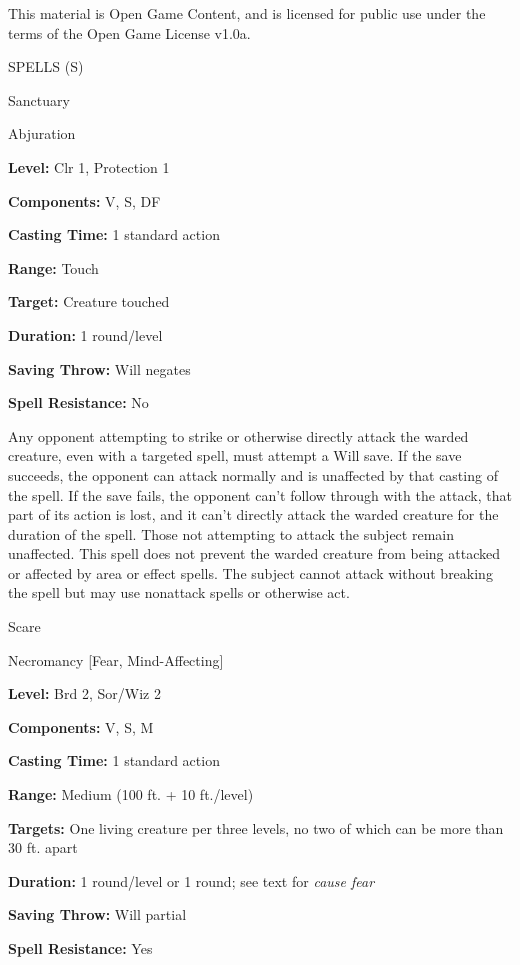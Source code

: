 \documentclass{article}
\begin{document}
This material is Open Game Content, and is licensed for public use under the terms 
of the Open Game License v1.0a.

{\LARGE{}SPELLS (S)}

\vspace{12pt}
Sanctuary

Abjuration

\textbf{Level:} Clr 1, Protection 1

\textbf{Components:} V, S, DF

\textbf{Casting Time:} 1 standard action

\textbf{Range:} Touch

\textbf{Target:} Creature touched

\textbf{Duration:} 1 round/level

\textbf{Saving Throw: }Will negates

\textbf{Spell Resistance:} No

Any opponent attempting to strike or otherwise directly attack the warded creature, 
even with a targeted spell, must attempt a Will save. If the save succeeds, the 
opponent can attack normally and is unaffected by that casting of the spell. If 
the save fails, the opponent can't follow through with the attack, that part of 
its action is lost, and it can't directly attack the warded creature for the duration 
of the spell. Those not attempting to attack the subject remain unaffected. This 
spell does not prevent the warded creature from being attacked or affected by area 
or effect spells. The subject cannot attack without breaking the spell but may 
use nonattack spells or otherwise act.

\vspace{12pt}
Scare

Necromancy [Fear, Mind-Affecting]

\textbf{Level:} Brd 2, Sor/Wiz 2

\textbf{Components:} V, S, M

\textbf{Casting Time:} 1 standard action

\textbf{Range: }Medium (100 ft. + 10 ft./level)

\textbf{Targets:} One living creature per three levels, no two of which can be 
more than 30 ft. apart

\textbf{Duration:} 1 round/level or 1 round; see text for \textit{cause fear}

\textbf{Saving Throw: }Will partial

\textbf{Spell Resistance:} Yes
\end{document}
